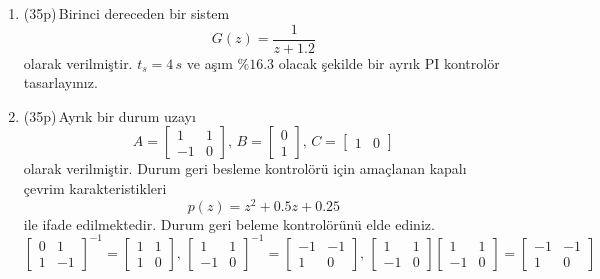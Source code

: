 \begin{enumerate}[\bfseries S1.]
    \item (35p)\,Birinci dereceden bir sistem 
    \begin{equation}
        G(z)=\frac{1}{z+1.2}
    \end{equation}
    olarak verilmiştir. $t_s=4\,s$ ve aşım $\%16.3$ olacak şekilde bir ayrık PI kontrolör tasarlayınız.
    \item (35p)\,Ayrık bir durum uzayı
    \begin{equation}
        A=\begin{bmatrix}1& 1\\-1&0\end{bmatrix},\,B=\begin{bmatrix}0\\1\end{bmatrix},\,C=\begin{bmatrix}1&0\end{bmatrix}
    \end{equation}
    olarak verilmiştir. Durum geri besleme kontrolörü için amaçlanan kapalı çevrim karakteristikleri
    \begin{equation}
        p(z)=z^2+0.5z+0.25
    \end{equation}
    ile ifade edilmektedir. Durum geri beleme kontrolörünü elde ediniz.
    \begin{equation*}
        \begin{bmatrix}0& 1\\1&-1\end{bmatrix}^{-1}=\begin{bmatrix}1& 1\\1&0\end{bmatrix},\,
        \begin{bmatrix}1& 1\\-1&0\end{bmatrix}^{-1}=\begin{bmatrix}-1& -1\\1&0\end{bmatrix},\,
        \begin{bmatrix}1& 1\\-1&0\end{bmatrix}\begin{bmatrix}1& 1\\-1&0\end{bmatrix}=\begin{bmatrix}-1& -1\\1&0\end{bmatrix}
    \end{equation*}

\end{enumerate}
